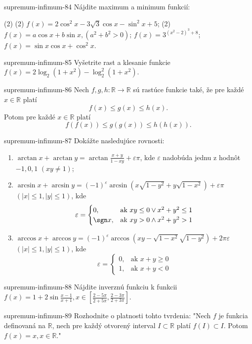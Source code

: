 \begin{defproblem}{supremum-infimum-84}
Nájdite maximum a minimum funkcií:
\begin{tasks}(2)
  \task*(2) $f(x)=2\cos^2 x -3\sqrt{3}\cos x -\sin^2 x +5$;
  \task*(2) $f(x)=a\cos x +b\sin x ,(a^2+b^2>0)$;
  \task $f(x)=3^{(x^2-2)^3+8}$;
  \task $f(x)=\sin x \cos x +\cos^2 x$.
\end{tasks}
\end{defproblem}

\begin{defproblem}{supremum-infimum-85}
Vyšetrite rast a klesanie funkcie $f(x)=2\log_2(1+x^2)-\log_2^2(1+x^2)$.
\end{defproblem}

\begin{defproblem}{supremum-infimum-86}
Nech $f,g,h:\mathbb{R}\rightarrow\mathbb{R}$ sú rastúce funkcie také, že pre každé $x\in\mathbb{R}$ platí $$f(x)\leq g(x)\leq h(x).$$
Potom pre každé $x\in\mathbb{R}$ platí $$f(f(x))\leq g(g(x))\leq h(h(x)).$$
\end{defproblem}

\begin{defproblem}{supremum-infimum-87}
Dokážte nasledujúce rovnosti:
\begin{enumerate}
\item $\arctan x +\arctan y =\arctan\frac{x+y}{1-xy}+\varepsilon\pi$, kde $\varepsilon$ nadobúda jednu z hodnôt $-1,0,1$ $(xy\neq 1)$;
\item $\arcsin x +\arcsin y=(-1)^\varepsilon\arcsin(x\sqrt{1-y^2}+y\sqrt{1-x^2})+\varepsilon\pi$ $(|x|\leq 1,|y|\leq 1)$, kde
\[
  \varepsilon =
    \begin{cases}
      0,      & \text{ak } xy \leq 0 \vee x^2 + y^2 \leq 1 \\
      \sgn x, & \text{ak } xy > 0 \wedge x^2 + y^2 > 1
    \end{cases}
\]
\item $\arccos x +\arccos y =(-1)^\varepsilon \arccos (xy-\sqrt{1-x^2}\sqrt{1-y^2})+2\pi\varepsilon$ $(|x|\leq 1,|y|\leq 1)$, kde
\[
  \varepsilon=
    \begin{cases}
      0, & \text{ak } x + y \geq 0 \\
      1, & \text{ak } x + y < 0
    \end{cases}
\]
\end{enumerate}
\end{defproblem}

\begin{defproblem}{supremum-infimum-88}
Nájdite inverznú funkciu k funkcii $f(x)=1+2\sin\frac{x-1}{x+1},x\in[\frac{2-5\pi}{2+5\pi},\frac{2-3\pi}{2+3\pi}]$.
\end{defproblem}

\begin{defproblem}{supremum-infimum-89}
Rozhodnite o platnosti tohto tvrdenia: "Nech $f$ je funkcia definovaná na $\mathbb{R}$, nech pre každý otvorený interval $I\subset\mathbb{R}$ platí $f(I)\subset I$. Potom $f(x)=x,x\in\mathbb{R}$."
\end{defproblem}